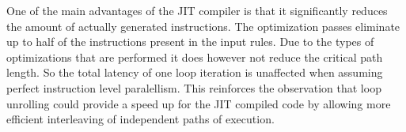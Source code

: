 One of the main advantages of the JIT compiler is that it significantly reduces the amount of actually generated instructions. The optimization passes eliminate up to half of the instructions present in the input rules. Due to the types of optimizations that are performed it does however not reduce the critical path length. So the total latency of one loop iteration is unaffected when assuming perfect instruction level paralellism. This reinforces the observation that loop unrolling could provide a speed up for the JIT compiled code by allowing more efficient interleaving of independent paths of execution.



